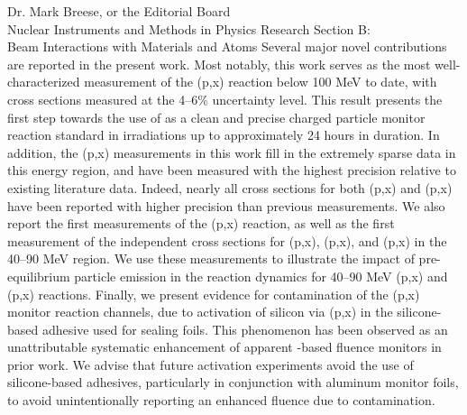 \documentclass{letter} %
\begin{document}
\begin{letter}{Dr. Mark Breese, or the Editorial Board \\
Nuclear Instruments and Methods in Physics Research Section B: \\
Beam Interactions with Materials and Atoms}
\noindent Several major novel contributions are reported in the present work. Most notably, this work serves as the most well-characterized measurement of the (p,x) reaction below 100 MeV to date, with cross sections measured  at the 4--6\% uncertainty level. 
This result presents the first step towards the use of  as a clean and precise   charged particle monitor reaction standard in irradiations up to approximately 24 hours in duration.
In addition, the (p,x) measurements in this work fill in the extremely sparse data in this energy region, and have been measured with the highest precision relative to existing literature data. 
Indeed, nearly all cross sections for both (p,x) and (p,x) have been reported with higher precision than previous measurements.
We also report the first measurements of the  (p,x) reaction, as well as the first measurement of the independent cross sections for    (p,x), (p,x), and (p,x) in the 40--90 MeV region.
We  use these measurements to illustrate the impact of pre-equilibrium particle emission in the reaction dynamics for 40--90 MeV (p,x) and  (p,x) reactions.
Finally, we present evidence for  contamination of the (p,x) monitor reaction channels, due to activation of silicon via (p,x)  in the silicone-based adhesive used for sealing foils.
This phenomenon has been observed as an unattributable systematic enhancement of apparent -based fluence monitors in prior work. 
We advise that future activation experiments avoid the use of silicone-based adhesives, particularly in conjunction with aluminum monitor foils, to avoid unintentionally reporting an enhanced fluence due to  contamination.







\end{letter}
\end{document}
